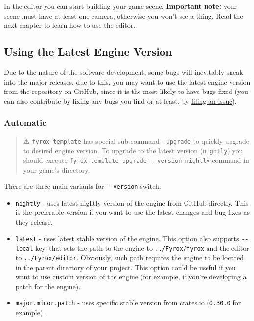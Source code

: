 \documentclass[
]{book}
\providecommand{\tightlist}{%
  \setlength{\itemsep}{0pt}\setlength{\parskip}{0pt}}
\theoremstyle{definition}
\theoremstyle{definition}
\theoremstyle{definition}
\theoremstyle{definition}
\theoremstyle{remark}
\begin{document}
In the editor you can start building your game scene. \textbf{Important note:} your scene must have at least one camera, otherwise you won't see a thing. Read the next chapter to learn how to use the editor.

\subsection{Using the Latest Engine Version}\label{using-the-latest-engine-version}

Due to the nature of the software development, some bugs will inevitably sneak into the major releases, due to this, you may want to use the latest engine version from the repository on GitHub, since it is the most likely to have bugs fixed (you can also contribute by fixing any bugs you find or at least, by \href{https://github.com/FyroxEngine/Fyrox/issues}{filing an issue}).

\subsubsection{Automatic}\label{automatic}

\begin{quote}
⚠️ \texttt{fyrox-template} has special sub-command - \texttt{upgrade} to quickly upgrade to desired engine version. To upgrade to
the latest version (\texttt{nightly}) you should execute \texttt{fyrox-template\ upgrade\ -\/-version\ nightly} command in your game's
directory.
\end{quote}

There are three main variants for \texttt{-\/-version} switch:

\begin{itemize}
\tightlist
\item
  \texttt{nightly} - uses latest nightly version of the engine from GitHub directly. This is the preferable version if you want to use the latest changes and bug fixes as they release.
\item
  \texttt{latest} - uses latest stable version of the engine. This option also supports \texttt{-\/-local} key, that sets the path to the engine to \texttt{../Fyrox/fyrox} and the editor to \texttt{../Fyrox/editor}. Obviously, such path requires the engine to be located in the parent directory of your project. This option could be useful if you want to use custom version of the engine (for example, if you're developing a patch for the engine).
\item
  \texttt{major.minor.patch} - uses specific stable version from crates.io (\texttt{0.30.0} for example).
\end{itemize}
\end{document}
